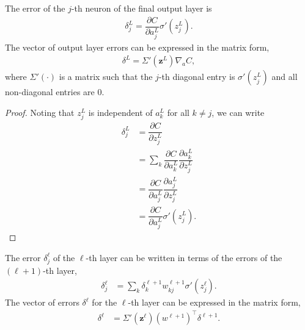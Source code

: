 \begin{lemma}
	The error of the $j$-th neuron of the final output layer is
	\begin{align*}
		\delta_j^L = \dfrac{\partial C}{\partial a_j^L}\sigma'(z_j^L).
	\end{align*}
	The vector of output layer errors can be expressed in the matrix form,
	\begin{align}\label{nnets-bprop-eq1}
		\delta^L = \Sigma'(\mathbf{z}^L)\nabla_aC,
	\end{align}
where $\Sigma'(\cdot)$ is a matrix such that the $j$-th diagonal entry is $\sigma'(z_j^L)$ and all non-diagonal entries are 0.
\end{lemma}

\begin{proof}

Noting that $z_j^L$ is independent of $a_k^L$ for all $k \neq j$, we can write
	\begin{align*}
		\delta_j^L & = \dfrac{\partial C}{\partial z_j^L}\\[0.7em]
		& = \sum_k\dfrac{\partial C}{\partial a_k^L}\dfrac{\partial a_k^L}{\partial z_j^L} \\[0.7em]
		& = \dfrac{\partial C}{\partial a_j^L}\dfrac{\partial a_j^L}{\partial z_j^L}\\[0.7em]
		& = \dfrac{\partial C}{\partial a_j^L}\sigma'(z_j^L).
	\end{align*}
\end{proof}

\begin{lemma}
	The error $\delta^\ell_j$ of the $\ell$-th layer can be written in terms of the errors of the $(\ell + 1)$-th layer, 
	\begin{align*}
		\delta_j^\ell & = \sum_k\delta_k^{\ell+1}w_{kj}^{\ell+1}\sigma'(z_j^\ell).
	\end{align*}
	The vector of errors $\delta^\ell$ for the $\ell$-th layer can be expressed in the matrix form,
	\begin{align}\label{nnets-bprop-eq2}
		\delta^\ell & = \Sigma'(\mathbf{z}^\ell)(w^{\ell+1})^\intercal\delta^{\ell+1}.
	\end{align}
\end{lemma}

